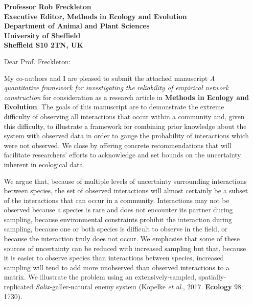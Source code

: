 \documentclass[12pt]{letter}
\begin{document}
\begin{letter}{\bf Professor Rob Freckleton\\
               Executive Editor, Methods in Ecology and Evolution\\
               Department of Animal and Plant Sciences\\
               University of Sheffield\\
               Sheffield S10 2TN, UK
                               }


\opening{Dear Prof. Freckleton:}

    My co-authors and I are pleased to submit the attached manuscript \emph{A quantitative framework for investigating the reliability of empirical network construction} for consideration as a research article in \textbf{Methods in Ecology and Evolution}. The goals of this manuscript are to demonstrate the extreme difficulty of observing all interactions that occur within a community and, given this difficulty, to illustrate a framework for combining prior knowledge about the system with observed data in order to gauge the probability of interactions which were not observed. We close by offering concrete recommendations that will facilitate researchers' efforts to acknowledge and set bounds on the uncertainty inherent in ecological data.


    We argue that, because of multiple levels of uncertainty surrounding interactions between species, the set of observed interactions will almost certainly be a subset of the interactions that can occur in a community. Interactions may not be observed because a species is rare and does not encounter its partner during sampling, because environmental constraints prohibit the interaction during sampling, because one or both species is difficult to observe in the field, or because the interaction truly does not occur. We emphasise that some of these sources of uncertainty can be reduced with increased sampling but that, because it is easier to observe species than interactions between species, increased sampling will tend to add more unobserved than observed interactions to a matrix. We illustrate the problem using an extensively-sampled, spatially-replicated \emph{Salix}-galler-natural enemy system (Kopelke \emph{et al.}, 2017. \textbf{Ecology} 98: 1730).



\end{letter}
\end{document}
